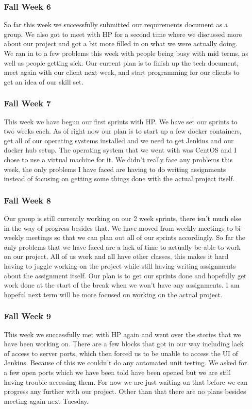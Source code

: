 \documentclass[onecolumn, draftclsnofoot,10pt, compsoc]{IEEEtran}
\begin{document}
\subsubsection*{Fall Week 6}
So far this week we successfully submitted our requirements document as a group. We also got to meet with HP for a second time where we discussed more about our project and got a bit more filled in on what we were actually doing. We ran in to a few problems this week with people being busy with mid terms, as well as people getting sick. Our current plan is to finish up the tech document, meet again with our client next week, and start programming for our clients to get an idea of our skill set.
\subsubsection*{Fall Week 7}

This week we have begun our first sprints with HP. We have set our sprints to two weeks each. As of right now our plan is to start up a few docker containers, get all of our operating systems installed and we need to get Jenkins and our docker hub setup. The operating system that we went with was CentOS and I chose to use a virtual machine for it. We didn't really face any problems this week, the only problems I have faced are having to do writing assignments instead of focusing on getting some things done with the actual project itself.
\subsubsection*{Fall Week 8}

Our group is still currently working on our 2 week sprints, there isn't much else in the way of progress besides that. We have moved from weekly meetings to bi-weekly meetings so that we can plan out all of our sprints accordingly. So far the only problems that we have faced are a lack of time to actually be able to work on our project. All of us work and all have other classes, this makes it hard having to juggle working on the project while still having writing assignments about the assignment itself. Our plan is to get our sprints done and hopefully get work done at the start of the break when we won't have any assignments. I am hopeful next term will be more focused on working on the actual project.
\subsubsection*{Fall Week 9}
This week we successfully met with HP again and went over the stories that we have been working on. There are a few blocks that got in our way including lack of access to server ports, which then forced us to be unable to access the UI of Jenkins. Because of this we couldn't do any automated unit testing. We asked for a few open ports which we have been told have been opened but we are still having trouble accessing them. For now we are just waiting on that before we can progress any further with our project. Other than that there are no plans besides meeting again next Tuesday.
\end{document}
